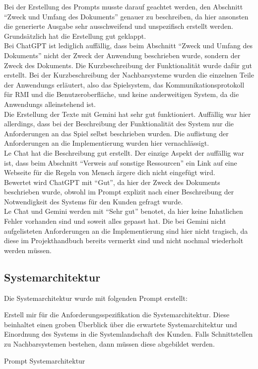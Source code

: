 Bei der Erstellung des Prompts musste darauf geachtet werden, den Abschnitt ``Zweck und Umfang des Dokuments'' genauer zu beschreiben, da hier ansonsten
die generierte Ausgabe sehr ausschweifend und unspezifisch erstellt werden. Grundsätzlich hat die Erstellung gut geklappt.\\

Bei ChatGPT ist lediglich auffällig, dass beim Abschnitt ``Zweck und Umfang des Dokuments'' nicht der Zweck der Anwendung beschrieben wurde, sondern der Zweck 
des Dokuments. Die Kurzbeschreibung der Funktionalität wurde dafür gut erstellt. Bei der Kurzbeschreibung der Nachbarsysteme wurden die einzelnen Teile 
der Anwendungs erläutert, also das Spielsystem, das Kommunikationsprotokoll für RMI und die Benutzeroberfläche, und keine anderweitigen System, da die 
Anwendungs alleinstehend ist.\\

Die Erstellung der Texte mit Gemini hat sehr gut funktioniert. Auffällig war hier allerdings, dass bei der Beschreibung der Funktionalität des System 
nur die Anforderungen an das Spiel selbst beschrieben wurden. Die auflistung der Anforderungen an die Implementierung wurden hier vernachlässigt.\\

Le Chat hat die Beschreibung gut erstellt. Der einzige Aspekt der auffällig war ist, dass beim Abschnitt ``Verweis auf sonstige Ressourcen'' ein Link 
auf eine Webseite für die Regeln von Mensch ärgere dich nicht eingefügt wird.\\

Bewertet wird ChatGPT mit ``Gut'', da hier der Zweck des Dokuments beschrieben wurde, obwohl im Prompt explizit nach einer Beschreibung der Notwendigkeit
des Systems für den Kunden gefragt wurde.\\
Le Chat und Gemini werden mit ``Sehr gut'' benotet, da hier keine Inhatlichen Fehler vorhanden sind und soweit alles gepasst hat. Die bei Gemini nicht 
aufgelisteten Anforderungen an die Implementierung sind hier nicht tragisch, da diese im Projekthandbuch bereits vermerkt sind und nicht nochmal 
wiederholt werden müssen.

\subsection*{Systemarchitektur}

Die Systemarchitektur wurde mit folgenden Prompt erstellt:

\begin{prompt}[H]
    \begin{tcolorbox}[colback=gray!20, colframe=gray!20, boxrule=0pt, sharp corners] 
        Erstell mir für die Anforderungsspezifikation die Systemarchitektur. Diese beinhaltet einen groben Überblick über die erwartete Systemarchitektur 
        und Einordnung des Systems in die Systemlandschaft des Kunden. Falls Schnittstellen zu Nachbarsystemen bestehen, dann müssen diese abgebildet werden.
        \vfill
    \end{tcolorbox}
    \caption{Prompt Systemarchitektur}
    \label{Prompt Systemarchitektur}
\end{prompt}

